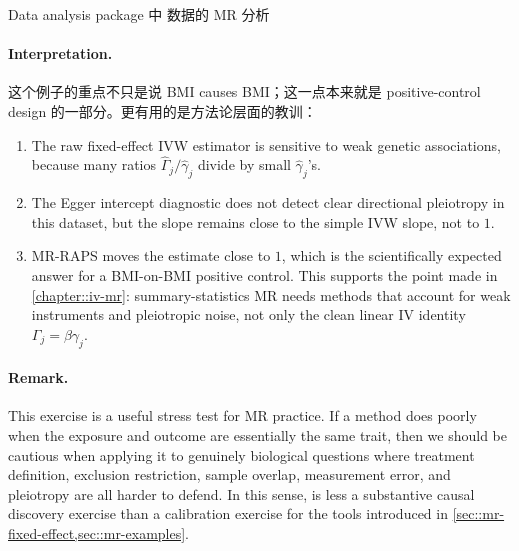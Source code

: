 \begin{exercisesolution}{Data analysis}{ package 中  数据的 MR 分析}
\paragraph{Interpretation.}
这个例子的重点不只是说 BMI causes BMI；这一点本来就是 positive-control design 的一部分。更有用的是方法论层面的教训：
\begin{enumerate}
\item
The raw fixed-effect IVW estimator is sensitive to weak genetic associations, because many ratios $\hat{\Gamma}_j/\hat{\gamma}_j$ divide by small $\hat{\gamma}_j$'s.
\item
The Egger intercept diagnostic does not detect clear directional pleiotropy in this dataset, but the slope remains close to the simple IVW slope, not to $1$.
\item
MR-RAPS moves the estimate close to $1$, which is the scientifically expected answer for a BMI-on-BMI positive control. This supports the point made in \cref{chapter::iv-mr}: summary-statistics MR needs methods that account for weak instruments and pleiotropic noise, not only the clean linear IV identity $\Gamma_j=\beta\gamma_j$.
\end{enumerate}

\paragraph{Remark.}
This exercise is a useful stress test for MR practice. If a method does poorly when the exposure and outcome are essentially the same trait, then we should be cautious when applying it to genuinely biological questions where treatment definition, exclusion restriction, sample overlap, measurement error, and pleiotropy are all harder to defend. In this sense,  is less a substantive causal discovery exercise than a calibration exercise for the tools introduced in \cref{sec::mr-fixed-effect,sec::mr-examples}.
\end{exercisesolution}
